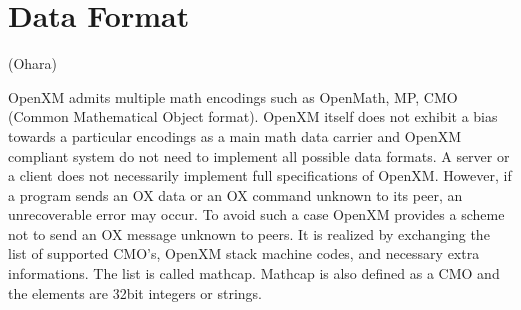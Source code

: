 
\section{Data Format}   (Ohara)

OpenXM admits multiple math encodings such as OpenMath, MP, CMO
(Common Mathematical Object format).
OpenXM itself does not exhibit a bias towards a particular encodings 
as a main math data carrier and OpenXM compliant system do not need to
implement all possible data formats.
A server or a client does not necessarily implement full specifications
of OpenXM. 
However, if a program sends an OX data or an OX command unknown to its peer, 
an unrecoverable error may occur. 
To avoid such a case OpenXM provides a scheme not
to send an OX message unknown to peers. 
It is realized by exchanging the list of
supported CMO's, OpenXM stack machine codes, and necessary extra informations. 
The list is called mathcap.
Mathcap is also defined as a CMO and the elements are 32bit integers
or strings.

